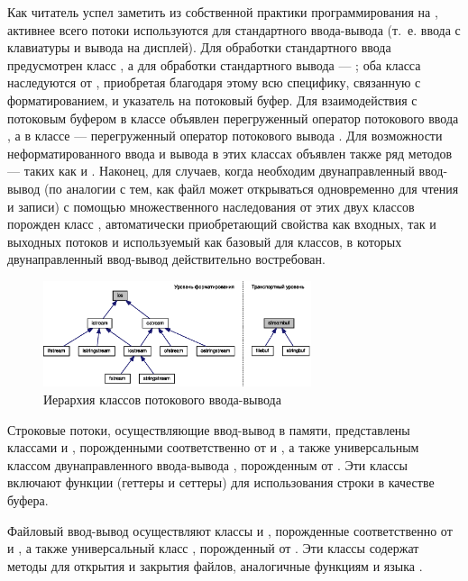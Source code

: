 Как читатель успел заметить из собственной практики программирования на , активнее всего потоки используются для
стандартного ввода-вывода (т.~е. ввода с клавиатуры и вывода на дисплей). Для обработки стандартного ввода предусмотрен
класс ,  а для обработки стандартного вывода --- ; оба класса
наследуются от , приобретая благодаря этому всю специфику, связанную с форматированием, и
указатель на потоковый буфер. Для взаимодействия с потоковым буфером в классе  объявлен
перегруженный оператор потокового ввода \Sys{{>}{>}}, а в классе
 --- перегруженный оператор потокового вывода \Sys{{<}{<}}.
Для возможности неформатированного ввода и вывода в этих классах объявлен также ряд методов --- таких как 
 и . Наконец, для случаев, когда необходим  двунаправленный
ввод-вывод (по аналогии с тем, как файл может открываться одновременно для чтения и записи) с помощью множественного
наследования от этих двух классов порожден класс , автоматически приобретающий свойства
как входных, так и выходных потоков и используемый как базовый для классов, в которых двунаправленный ввод-вывод
действительно востребован.

\begin{figure}[htb]
\begin{center}
\includegraphics[width=0.7\textwidth]{img/ris_10_4}
\caption{Иерархия классов потокового ввода-вывода}
\label{ch10:refDrawing3}
\end{center}
\end{figure}

Строковые потоки, осуществляющие ввод-вывод в памяти, представлены классами  и
, порожденными соответственно от  и
, а также универсальным классом двунаправленного ввода-вывода
, порожденным от . Эти классы включают функции (геттеры
и сеттеры) для использования строки в качестве буфера.

Файловый ввод-вывод осуществляют классы  и , порожденные
соответственно от  и , а также универсальный класс
, порожденный от . Эти классы содержат методы для открытия и
закрытия файлов, аналогичные функциям  и  языка .

